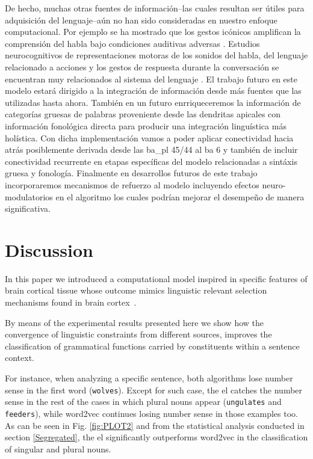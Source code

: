 {De hecho, muchas otras fuentes de información--las cuales resultan ser útiles para adquisición del lenguaje--aún no han sido consideradas en nuestro enfoque computacional.
Por ejemplo se ha mostrado que los gestos icónicos amplifican la comprensión del habla bajo condiciones auditivas adversas \cite{HOLLE2010875}.
Estudios neurocognitivos de representaciones motoras de los sonidos del habla, del lenguaje relacionado a acciones y los gestos de respuesta durante la conversación se encuentran muy relacionados al sistema del lenguaje \cite{Willems2007NeuralEF}.
El trabajo futuro en este modelo estará dirigido a la integración de información desde más fuentes que las utilizadas hasta ahora.
También en un futuro enrriqueceremos la información de categorías gruesas de palabras proveniente desde las dendritas apicales con información fonológica directa para producir una integración linguística más holística.
Con dicha implementación vamos a poder aplicar conectividad hacia atrás posiblemente derivada desde las \gls{ba_pl} 45/44 al \gls{ba} 6 y también de incluir conectividad recurrente en etapas específicas del modelo relacionadas a sintáxis gruesa y fonología.
Finalmente en desarrollos futuros de este trabajo incorporaremos mecanismos de refuerzo al modelo incluyendo efectos neuro-modulatorios en el algoritmo los cuales podrían mejorar el desempeño de manera significativa.
}{
\section{Discussion}

In this paper we introduced a computational model inspired in specific features of brain cortical tissue whose outcome mimics linguistic relevant selection mechanisms found in brain cortex~\cite{Gibson1998-GIBCOS, Hagoort2005OnBB, Rego1993TheCB, 10.1371/journal.pone.0177794}.

By means of the experimental results presented here we show how the convergence of linguistic constraints from different sources, improves the classification of grammatical functions carried by constituents within a sentence context.

For instance, when analyzing a specific sentence, both algorithms lose number sense in the first word (\texttt{wolves}). Except for such case, the \gls{el} catches the number sense in the rest of the cases in which plural nouns appear (\texttt{ungulates} and \texttt{feeders}), while word2vec continues losing number sense in those examples too.
As can be seen in Fig. \ref{fig:PLOT2} and from the statistical analysis conducted in section \ref{Segregated}, the \gls{el} significantly outperforms word2vec in the classification of singular and plural nouns.

}
